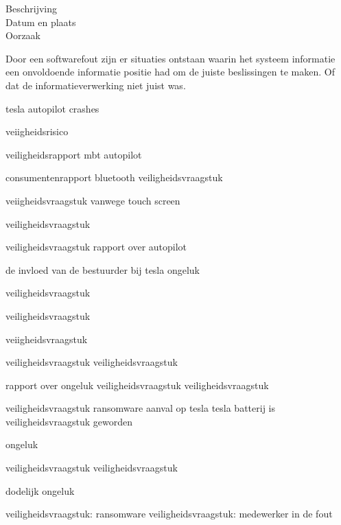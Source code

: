\begin{description}
\item[Beschrijving]
\item[Datum en plaats] 
\item[Oorzaak]
\end{description}
Door een softwarefout zijn er situaties ontstaan waarin het systeem informatie een onvoldoende informatie positie had om de juiste beslissingen te maken. Of dat de informatieverwerking niet juist was.


tesla autopilot crashes


veiigheidsrisico

\cite{evan01042019teslaautopilotIntersection}

\cite{testVehicleSafetyReport}
veiligheidsrapport mbt autopilot

\cite{lambert31062020q2safetyreport}
consumentenrapport
bluetooth veiligheidsvraagstuk

\cite{wiredBloutoothHackTesla}
veiigheidsvraagstuk vanwege touch screen

\cite{preston14012021NHTSATeslaRecall}
veiligheidsvraagstuk

\cite{cio25112020belgianTeslaHack}
veiligheidsvraagstuk
rapport over autopilot

\cite{templeton06092019HTSBReportTesla}
de invloed van de bestuurder bij tesla ongeluk

veiligheidsvraagstuk

\cite{darkReading17112020TeslaBackup}
veiligheidsvraagstuk

\cite{leyden23032020TeslaInterfaceHack}
veiigheidsvraagstuk

\cite{huddlestonjr03042019ChineseTeslaHack}
veiligheidsvraagstuk
veiligheidsvraagstuk

\cite{heilweil26022020teslaAutopilot}
rapport over ongeluk
veiligheidsvraagstuk
veiligheidsvraagstuk

\cite{blanco04102019NHTSATesla}
veiligheidsvraagstuk
ransomware aanval op tesla
tesla batterij is veiligheidsvraagstuk geworden

\cite{mitchell01072020teslabatterycooling}
ongeluk

\cite{bbc26022020AutopilotCrash}
veiligheidsvraagstuk
veiligheidsvraagstuk

\cite{stumpff04052020TeslaPersonalData}
dodelijk ongeluk

\cite{levin08062018teslaautopilotsafety}
veiligheidsvraagstuk: ransomware
veiligheidsvraagstuk: medewerker in de fout

